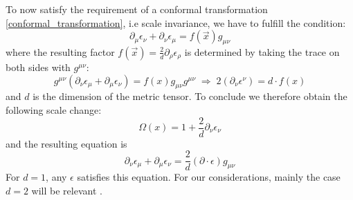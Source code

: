 \documentclass[11pt, a4paper, oneside]{book}
\theoremstyle{definition} %
\begin{document}
To now satisfy the requirement of a conformal transformation \ref{conformal_transformation}, i.e scale invariance, we have to fulfill the condition:
\begin{equation}
	\partial_\mu \epsilon_\nu + \partial_\nu \epsilon_\mu = f(\vec{x}) g_{\mu \nu}
\end{equation}
where the resulting factor $f(\vec{x})= \frac{2}{d} \partial_\rho \epsilon_\rho$ is determined by taking the trace on both sides with $g^{\mu \nu}$:
\begin{equation}
		g^{\mu \nu}(\partial_\nu \epsilon_\mu + \partial_\mu \epsilon_\nu) = f(x) g_{\mu \nu} g^{\mu \nu} \;\Rightarrow \;
		2(\partial_\nu \epsilon^\nu) = d \cdot f(x)
\end{equation}
and $d$ is the dimension of the metric tensor. To conclude we therefore obtain the following scale change:
\begin{equation}
	\Omega(x) = 1 + \frac{2}{d} \partial_\nu \epsilon_\nu
\end{equation}
and the resulting equation is
\begin{equation}
	\partial_\nu \epsilon_\mu + \partial_\mu \epsilon_\nu = \frac{2}{d}(\partial \cdot \epsilon) g_{\mu \nu}
	\label{eq:conformal_requirement}
\end{equation}
For $d=1$, any $\epsilon$ satisfies this equation. For our considerations, mainly the case $d=2$ will be relevant \cite{Schellekens,Francesco}.
\end{document}
